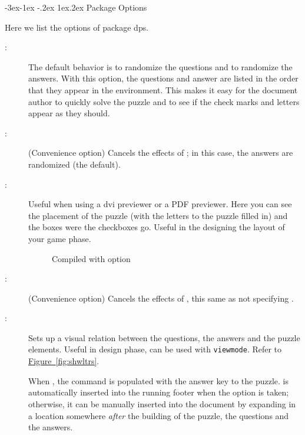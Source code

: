 \documentclass{article}
\makeatletter
\def\FmtMP#1{\marginpar{\slshape\raggedleft\small#1}}
\renewcommand{\section}{%
   \renewcommand{\@seccntformat}[1]{\csname the##1\endcsname.\enspace}%
   \@startsection{section}{1}{-62.5pt}%
   {-3ex\@plus -1ex \@minus-.2ex}%
   {1ex\@plus .2ex}%
   {\noindent\normalfont\large\bfseries\color{blue}}}%
\makeatother
\begin{document}
\section{Package Options}\label{packopts}

Here we list the options of package \textsf{dps}.

\begin{description}
\item[:] The default behavior is to
    randomize the questions and to randomize the answers. With this
    option, the questions and answer are listed in the order that they
    appear in the  environment. This makes it easy for
    the document author to quickly solve the puzzle and to see if the
    check marks and letters appear as they should.

\item[:] (Convenience option) Cancels the effects of
    ; in this case, the answers are randomized (the
    default).

\item[:] Useful when using a dvi previewer or a
    PDF previewer. Here you can see the placement of the puzzle (with the
    letters to the puzzle filled in) and the boxes were the checkboxes go.
    Useful in the designing the layout of your game phase.

\begin{figure}[htb]\centering{}
\caption{Compiled with  option}
\end{figure}

\item[:] (Convenience option) Cancels the effects of
, this same as not specifying .

\item[:] Sets up a visual relation
    between the questions, the answers and the puzzle elements.  Useful
    in design phase, can be used with \texttt{viewmode}. Refer to \hyperref[fig:shwltrs]{Figure~\ref*{fig:shwltrs}}.

    When , the command  is populated with
    the answer key to the puzzle. \FmtMP{\cs{AnswerKey}} is automatically inserted
    into the running footer when the  option is taken;
    otherwise, it can be manually inserted into the document by expanding
     in a location somewhere \emph{after} the building of the
    puzzle, the questions and the answers.


\end{description}
\end{document}
